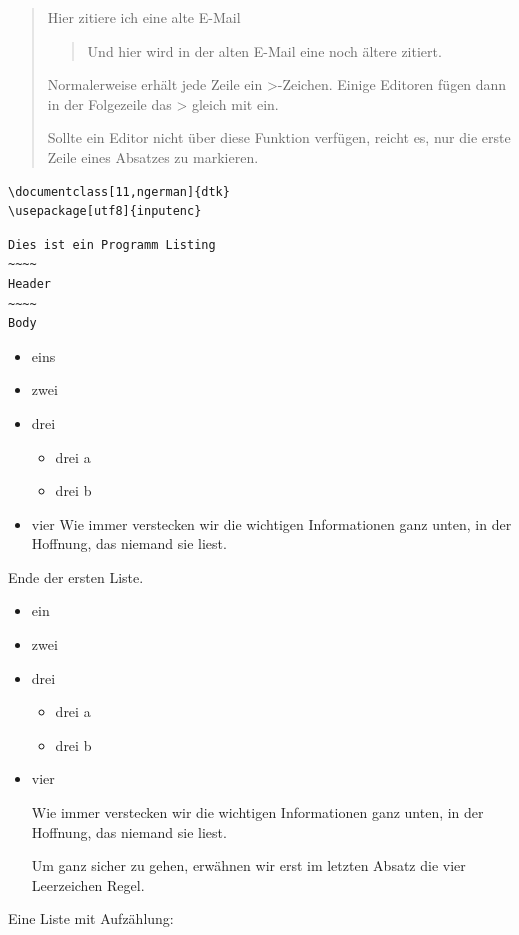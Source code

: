\documentclass{article}
\begin{document}
\begin{quote}
Hier zitiere ich eine alte E-Mail

\begin{quote}
Und hier wird in der alten E-Mail eine noch ältere zitiert.

\end{quote}
Normalerweise erhält jede Zeile ein \textgreater{}-Zeichen. Einige
Editoren fügen dann in der Folgezeile das \textgreater{} gleich mit ein.

Sollte ein Editor nicht über diese Funktion verfügen, reicht es, nur die
erste Zeile eines Absatzes zu markieren.

\end{quote}
\begin{verbatim}
\documentclass[11,ngerman]{dtk}
\usepackage[utf8]{inputenc}
\end{verbatim}
\begin{verbatim}
Dies ist ein Programm Listing
~~~~
Header
~~~~
Body
\end{verbatim}
\begin{itemize}
\item
  eins
\item
  zwei
\item
  drei
  \begin{itemize}
  \item
    drei a
  \item
    drei b
  \end{itemize}
\item
  vier Wie immer verstecken wir die wichtigen Informationen ganz unten,
  in der Hoffnung, das niemand sie liest.
\end{itemize}
Ende der ersten Liste.

\begin{itemize}
\item
  ein
\item
  zwei
\item
  drei
  \begin{itemize}
  \item
    drei a
  \item
    drei b
  \end{itemize}
\item
  vier

  Wie immer verstecken wir die wichtigen Informationen ganz unten, in
  der Hoffnung, das niemand sie liest.

  Um ganz sicher zu gehen, erwähnen wir erst im letzten Absatz die vier
  Leerzeichen Regel.
\end{itemize}
Eine Liste mit Aufzählung:
\end{document}
